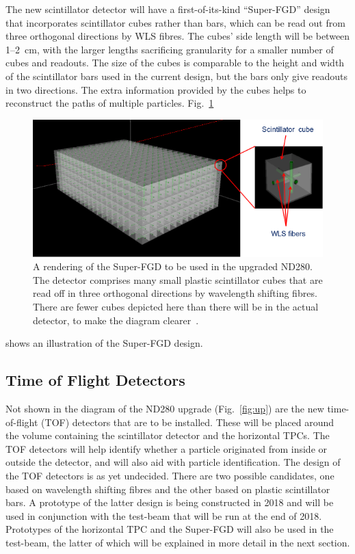 \documentclass[aps,pra,12pt,notitlepage,tightenlines]{revtex4-1}
\begin{document}
The new scintillator detector will have a first-of-its-kind ``Super-FGD'' design that incorporates scintillator cubes rather than bars, which can be read out from three orthogonal directions by WLS fibres. The cubes' side length will be between 1--2~cm, with the larger lengths sacrificing granularity for a smaller number of cubes and readouts. The size of the cubes is comparable to the height and width of the scintillator bars used in the current design, but the bars only give readouts in two directions. The extra information provided by the cubes helps to reconstruct the paths of multiple particles. Fig.~\ref{fig:sfgd}
 \begin{figure}
  \includegraphics[scale=0.75]{SFGD.png}
  \caption{A rendering of the Super-FGD to be used in the upgraded ND280. The detector comprises many small plastic scintillator cubes that are read off in three orthogonal directions by wavelength shifting fibres. There are fewer cubes depicted here than there will be in the actual detector, to make the diagram clearer~\cite{Blondel:2299599}.}
  \label{fig:sfgd}
 \end{figure}
shows an illustration of the Super-FGD design.

\subsection{Time of Flight Detectors}
Not shown in the diagram of the ND280 upgrade (Fig.\ \ref{fig:up}) are the new time-of-flight (TOF) detectors that are to be installed. These will be placed around the volume containing the scintillator detector and the horizontal TPCs. The TOF detectors will help identify whether a particle originated from inside or outside the detector, and will also aid with particle identification. The design of the TOF detectors is as yet undecided. There are two possible candidates, one based on wavelength shifting fibres and the other based on plastic scintillator bars. A prototype of the latter design is being constructed in 2018 and will be used in conjunction with the test-beam that will be run at the end of 2018. Prototypes of the horizontal TPC and the Super-FGD will also be used in the test-beam, the latter of which will be explained in more detail in the next section.
\end{document}
